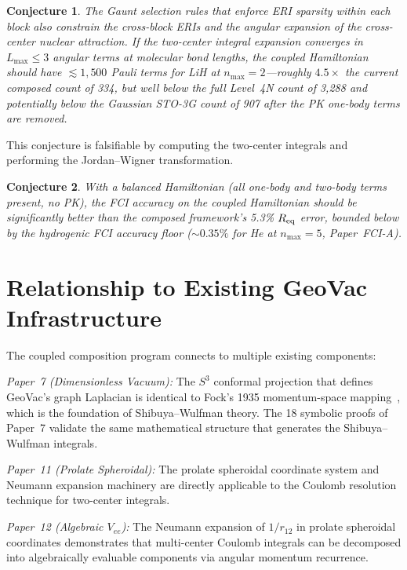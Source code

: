 \documentclass[aps,pra,twocolumn,superscriptaddress,longbibliography]{revtex4-2}
\newtheorem{conjecture}{Conjecture}
\begin{document}
\begin{conjecture}
\label{conj:sparsity}
The Gaunt selection rules that enforce ERI sparsity within each block
also constrain the cross-block ERIs and the angular expansion of the
cross-center nuclear attraction.  If the two-center integral expansion
converges in $L_{\max} \le 3$ angular terms at molecular bond lengths,
the coupled Hamiltonian should have $\lesssim 1{,}500$ Pauli terms for
LiH at $n_{\max} = 2$---roughly $4.5\times$ the current composed
count of 334, but well below the full Level~4N count of 3{,}288 and
potentially below the Gaussian STO-3G count of 907 after the PK
one-body terms are removed.
\end{conjecture}

This conjecture is falsifiable by computing the two-center integrals
and performing the Jordan--Wigner transformation.

\begin{conjecture}
\label{conj:accuracy}
With a balanced Hamiltonian (all one-body and two-body terms present,
no PK), the FCI accuracy on the coupled Hamiltonian should be
significantly better than the composed framework's 5.3\% $R_{\rm eq}$
error, bounded below by the hydrogenic FCI accuracy floor
(${\sim}0.35\%$ for He at $n_{\max} = 5$, Paper~FCI-A).
\end{conjecture}


\section{Relationship to Existing GeoVac Infrastructure}
\label{sec:infrastructure}

The coupled composition program connects to multiple existing
components:

\emph{Paper~7 (Dimensionless Vacuum):} The $S^3$ conformal projection
that defines GeoVac's graph Laplacian is identical to Fock's
1935 momentum-space mapping~\cite{fock1935}, which is the foundation
of Shibuya--Wulfman theory.  The 18 symbolic proofs of Paper~7
validate the same mathematical structure that generates the
Shibuya--Wulfman integrals.

\emph{Paper~11 (Prolate Spheroidal):} The prolate spheroidal
coordinate system and Neumann expansion machinery are directly
applicable to the Coulomb resolution technique for two-center
integrals.

\emph{Paper~12 (Algebraic $V_{ee}$):} The Neumann expansion of
$1/r_{12}$ in prolate spheroidal coordinates demonstrates that
multi-center Coulomb integrals can be decomposed into algebraically
evaluable components via angular momentum recurrence.
\end{document}
